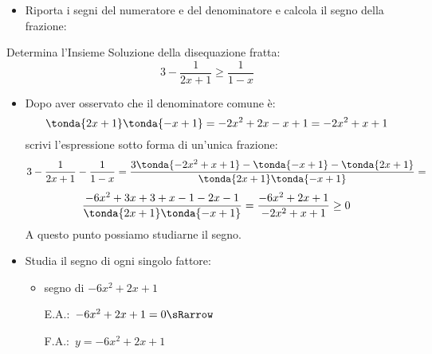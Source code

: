\begin{esempio}
\begin{itemize}
\begin{itemize}
\end{itemize}
 \item Riporta i segni del numeratore e del denominatore e calcola
il segno della frazione:

\begin{inaccessibleblock}
\vspace{1em}
  \begin{center}
  \segnofrazioneb
  \end{center}
\end{inaccessibleblock}

\end{itemize}
\end{esempio}

\begin{esempio}
Determina l'Insieme Soluzione della disequazione fratta:
\[3-\dfrac{1}{2x+1} \ge \dfrac{1}{1-x}\]

\begin{itemize}

\item Dopo aver osservato che il denominatore comune è:
\[\tonda{2x+1}\tonda{-x+1} = -2x^2 +2x -x +1 = -2x^2 +x +1\]
scrivi l'espressione sotto forma di un'unica frazione:
\[3-\dfrac{1}{2x+1} - \dfrac{1}{1-x} =
  \dfrac{3 \tonda{-2x^2 +x +1} - \tonda{-x+1} - \tonda{2x+1}}
        {\tonda{2x+1}\tonda{-x+1}} =\]
\[\dfrac{-6x^2 +3x +3 +x-1 -2x-1}
        {\tonda{2x+1}\tonda{-x+1}} =
  \dfrac{-6x^2 +2x +1}
        {-2x^2 +x +1} \ge 0\]
A questo punto possiamo studiarne il segno.

 \item Studia il segno di ogni singolo fattore:

\begin{itemize}

 \item  segno di \(-6x^2 +2x +1\)\\
 \begin{minipage}{.35\textwidth}
  E.A.:~\(-6x^2 +2x +1=0 \sRarrow\)\\

  \vspace{1.8em}
 \end{minipage}
 \begin{minipage}{.25\textwidth}
  F.A.:~\(y=-6x^2 +2x +1\)
  \vspace{1.8em}
 \end{minipage}
 \begin{minipage}{.38\textwidth}
  \begin{inaccessibleblock}
\end{inaccessibleblock}
 \end{minipage}


\end{itemize}
\end{itemize}
\end{esempio}
